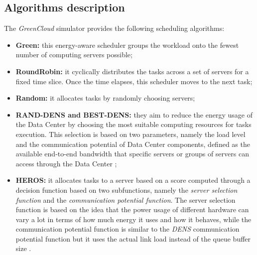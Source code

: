 \subsection{Algorithms description}
The \emph{GreenCloud} simulator provides the following scheduling algorithms:
\begin{itemize}
    \item \textbf{Green:} this energy-aware scheduler groups the workload onto the fewest number of computing servers possible;
    \item \textbf{RoundRobin:} it cyclically distributes the tasks across a set of servers for a fixed time slice. Once the time elapses, this scheduler moves to the next task;
    \item \textbf{Random:} it allocates tasks by randomly choosing servers;
    \item \textbf{RAND-DENS and BEST-DENS:} they aim to reduce the energy usage of the Data Center by choosing the most suitable computing resources for tasks execution. This selection is based on two parameters, namely the load level and the communication potential of Data Center components, defined as the available end-to-end bandwidth that specific servers or groups of servers can access through the Data Center \cite{kliazovich2013dens};
    \item \textbf{HEROS:} it allocates tasks to a server based on a score computed through a decision function based on two subfunctions, namely the \emph{server selection function} and the \emph{communication potential function}. The server selection function is based on the idea that the power usage of different hardware can vary a lot in terms of how much energy it uses and how it behaves, while the communication potential function is similar to the \emph{DENS} communication potential function but it uses the actual link load instead of the queue buffer size \cite{guzek2015heros}.
\end{itemize}
